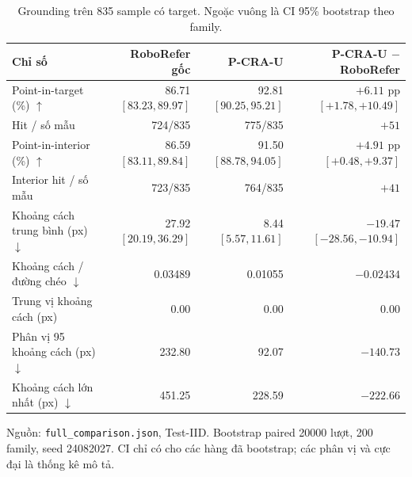 \begin{table}[htbp]
    \centering
    \setlength{\tabcolsep}{4pt}
    \renewcommand{\arraystretch}{1.15}
    \caption{Grounding trên 835 sample có target.
    Ngoặc vuông là CI 95\% bootstrap theo family.}
    \label{tab:results-grounding-main}
    \small
    \begin{tabularx}{\textwidth}{@{}>{\raggedright\arraybackslash}Xrrr@{}}
        \toprule
        Chỉ số & \shortstack{RoboRefer\\gốc} & P-CRA-U & \shortstack{P-CRA-U\\$-$ RoboRefer} \\
        \midrule
        Point-in-target (\%) $\uparrow$ &
        \shortstack{86.71\\$[83.23,89.97]$} &
        \shortstack{92.81\\$[90.25,95.21]$} &
        \shortstack{$+6.11$ pp\\$[+1.78,+10.49]$} \\
        Hit / số mẫu & 724/835 & 775/835 & $+51$ \\
        \addlinespace
        Point-in-interior (\%) $\uparrow$ &
        \shortstack{86.59\\$[83.11,89.84]$} &
        \shortstack{91.50\\$[88.78,94.05]$} &
        \shortstack{$+4.91$ pp\\$[+0.48,+9.37]$} \\
        Interior hit / số mẫu & 723/835 & 764/835 & $+41$ \\
        \addlinespace
        Khoảng cách trung bình (px) $\downarrow$ &
        \shortstack{27.92\\$[20.19,36.29]$} &
        \shortstack{8.44\\$[5.57,11.61]$} &
        \shortstack{$-19.47$\\$[-28.56,-10.94]$} \\
        Khoảng cách / đường chéo $\downarrow$ & 0.03489 & 0.01055 & $-0.02434$ \\
        Trung vị khoảng cách (px) & 0.00 & 0.00 & 0.00 \\
        Phân vị 95 khoảng cách (px) $\downarrow$ & 232.80 & 92.07 & $-140.73$ \\
        Khoảng cách lớn nhất (px) $\downarrow$ & 451.25 & 228.59 & $-222.66$ \\
        \bottomrule
    \end{tabularx}
    \vspace{2pt}
    {\footnotesize\raggedright Nguồn: \texttt{full\_\allowbreak comparison.json}, Test-IID.
    Bootstrap paired 20000 lượt, 200 family, seed 24082027.
    CI chỉ có cho các hàng đã bootstrap; các phân vị và cực đại
    là thống kê mô tả.\par}
\end{table}

